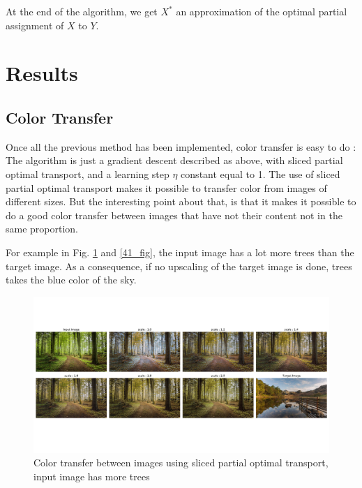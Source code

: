 \documentclass[a4paper,12pt]{article}
\begin{document}
At the end of the algorithm, we get $X^*$ an approximation of the optimal partial assignment of $X$ to $Y$.


\section{Results}

\subsection{Color Transfer}

Once all the previous method has been implemented, color transfer is easy to do : The algorithm is just a gradient descent described as above, with sliced partial optimal transport, and a learning step $\eta$ constant equal to 1. The use of sliced partial optimal transport makes it possible to transfer color from images of different sizes. But the interesting point about that, is that it makes it possible to do a good color transfer between images that have not their content not in the same proportion. 

For example in Fig. \ref{42_fig} and \ref{41_fig}, the input image has a lot more trees than the target image. As a consequence, if no upscaling of the target image is done, trees takes the blue color of the sky.

\begin{figure}[H]
\includegraphics[trim=0cm 3cm 0cm 1.5cm, width = \columnwidth]{landscape42.pdf}
\caption{Color transfer between images using sliced partial optimal transport, input image has more trees}\label{42_fig}
\end{figure}
\end{document}
